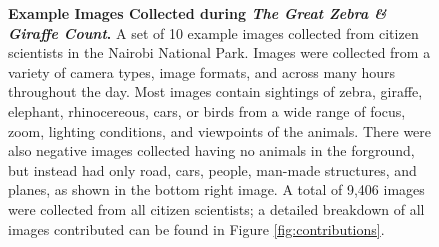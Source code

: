\begin{figure}[t]%
    \centering
    \vspace{0.1cm}
    \vspace{0.1cm}
    \caption[Example Images Collected during \textit{The Great Zebra \& Giraffe Count}]{\textbf{Example Images Collected during \textit{The Great Zebra \& Giraffe Count}.}  A set of 10 example images collected from citizen scientists in the Nairobi National Park.  Images were collected from a variety of camera types, image formats, and across many hours throughout the day.  Most images contain sightings of zebra, giraffe, elephant, rhinocereous, cars, or birds from a wide range of focus, zoom, lighting conditions, and viewpoints of the animals.  There were also negative images collected having no animals in the forground, but instead had only road, cars, people, man-made structures, and planes, as shown in the bottom right image.  A total of 9,406 images were collected from all citizen scientists; a detailed breakdown of all images contributed can be found in Figure \ref{fig:contributions}.}
        \label{fig:images}
\end{figure}

